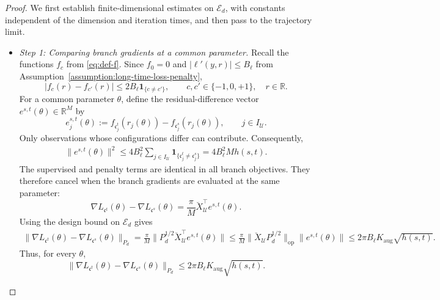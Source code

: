 \begin{proof}
We first establish finite-dimensional estimates on
$\mathcal E_d$, with constants independent of the dimension
and iteration times, and then pass to the trajectory limit.

\begin{itemize}[wide]
    \item \emph{Step 1: Comparing branch gradients at a common parameter.}
Recall the functions $f_c$ from \eqref{eq:def-f}.
Since $f_0=0$ and $|\ell'(y,r)|\leq B_\ell$ from Assumption~\ref{assumption:long-time-loss-penalty},
\[
    |f_c(r)-f_{c'}(r)|
    \leq2B_\ell\mathbf1_{\{c\neq c'\}},
    \qquad
    c,c'\in\{-1,0,+1\},\quad r\in\mathbb R.
\]
For a common parameter $\theta$, define the residual-difference
vector $e^{s,t}(\theta)\in\mathbb R^M$ by
\[
    e_j^{s,t}(\theta)
    :=
    f_{\mathfrak c_j^t}(r_j(\theta))
    -
    f_{\mathfrak c_j^s}(r_j(\theta)),
    \qquad j\in I_{\mathcal U}.
\]
Only observations whose configurations differ can contribute.
Consequently,
\[
\begin{aligned}
    \|e^{s,t}(\theta)\|^2
    \leq
    4B_\ell^2
    \sum_{j\in I_{\mathcal U}}
        \mathbf1_{\{\mathfrak c_j^t\neq\mathfrak c_j^s\}}
    =4B_\ell^2Mh(s,t).
\end{aligned}
\]
The supervised and penalty terms are identical in all branch
objectives. They therefore cancel when the branch gradients
are evaluated at the same parameter:
\[
    \nabla L_{\mathfrak c^t}(\theta)
    -
    \nabla L_{\mathfrak c^s}(\theta)
    =
    \frac{\pi}{M}
    \breve X_{\mathcal U}^{\top}e^{s,t}(\theta).
\]
Using the design bound on $\mathcal E_d$ gives
\[
\begin{aligned}
    \|\nabla L_{\mathfrak c^t}(\theta)
          -\nabla L_{\mathfrak c^s}(\theta)\|_{P_d}
    =
    \frac{\pi}{M}
    \|P_d^{1/2}\breve X_{\mathcal U}^{\top}
        e^{s,t}(\theta)\|
    \leq
    \frac{\pi}{M}
    \|\breve X_{\mathcal U}P_d^{1/2}\|_{\mathrm{op}}
    \|e^{s,t}(\theta)\|
    \leq
    2\pi B_\ell K_{\mathrm{aug}}\sqrt{h(s,t)}.
\end{aligned}
\]
Thus, for every $\theta$,
\begin{equation}
    \|\nabla L_{\mathfrak c^t}(\theta)
          -\nabla L_{\mathfrak c^s}(\theta)\|_{P_d}
    \leq
    2\pi B_\ell K_{\mathrm{aug}}\sqrt{h(s,t)}.
    \label{eq:long-time-gradient-perturbation}
\end{equation}


\end{itemize}
\end{proof}
